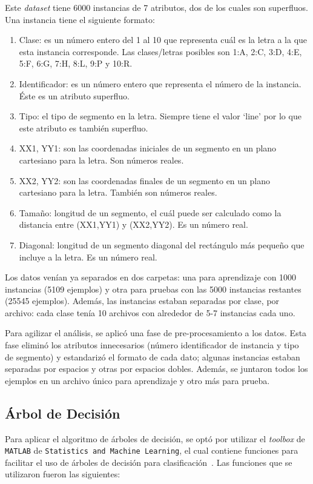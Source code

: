 \documentclass{llncs}
\begin{document}
Este \textit{dataset} tiene 6000 instancias de 7 atributos, dos de los cuales son superfluos. Una instancia tiene el siguiente formato:

\begin{enumerate}
	\item Clase: es un número entero del 1 al 10 que representa cuál es la letra a la que esta instancia corresponde. Las clases/letras posibles son 1:A, 2:C, 3:D, 4:E, 5:F, 6:G, 7:H, 8:L, 9:P y 10:R.
	\item Identificador: es un número entero que representa el número de la instancia. Éste es un atributo superfluo.
	\item Tipo: el tipo de segmento en la letra. Siempre tiene el valor `line' por lo que este atributo es también superfluo.
	\item XX1, YY1: son las coordenadas iniciales de un segmento en un plano cartesiano para la letra. Son números reales.
	\item XX2, YY2: son las coordenadas finales de un segmento en un plano cartesiano para la letra. También son números reales.
	\item Tamaño: longitud de un segmento, el cuál puede ser calculado como la distancia entre (XX1,YY1) y (XX2,YY2). Es un número real.
	\item Diagonal: longitud de un segmento diagonal del rectángulo más pequeño que incluye a la letra. Es un número real.
\end{enumerate}

Los datos venían ya separados en dos carpetas: una para aprendizaje con 1000 instancias (5109 ejemplos) y otra para pruebas con las 5000 instancias restantes (25545 ejemplos).
Además, las instancias estaban separadas por clase, por archivo: cada clase tenía 10 archivos con alrededor de 5-7 instancias cada uno.

Para agilizar el análisis, se aplicó una fase de pre-procesamiento a los datos.
Esta fase eliminó los atributos innecesarios (número identificador de instancia y tipo de segmento) y estandarizó el formato de cada dato; algunas instancias estaban separadas por espacios y otras por espacios dobles.
Además, se juntaron todos los ejemplos en un archivo único para aprendizaje y otro más para prueba.

\subsection{Árbol de Decisión}
\label{subsec:tree}

Para aplicar el algoritmo de árboles de decisión, se optó por utilizar el \textit{toolbox} de \texttt{MATLAB} de \texttt{Statistics and Machine Learning}, el cual contiene funciones para facilitar el uso de árboles de decisión para clasificación~\cite{MATLAB:2017}.
Las funciones que se utilizaron fueron las siguientes:
\end{document}
